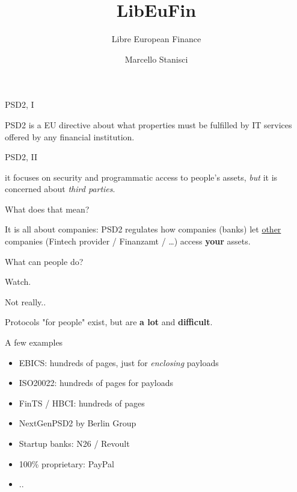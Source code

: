 \documentclass[pdf]{beamer}
\title{LibEuFin}
\subtitle{Libre European Finance}
\author{Marcello Stanisci}
\begin{document}

\begin{frame}
  \titlepage
\end{frame}



\begin{frame}{PSD2, I}
  \begin{center}
  PSD2 is a EU directive about what properties must be fulfilled by
  IT services offered by any financial institution.
  \end{center}
\end{frame}

\begin{frame}{PSD2, II}
  \begin{center}
  it focuses on security and programmatic access to people's assets,
  {\it but} it is concerned about {\it third parties}.
  \end{center}
\end{frame}

\begin{frame}{What does that mean?}
  \begin{center}
  It is all about companies: PSD2 regulates how companies (banks) let
  \underline{other} companies (Fintech provider / Finanzamt / \dots) access
  \textbf{your} assets.
  \end{center}
\end{frame}

\begin{frame}{What can people do?}
  \begin{center}
  Watch.
  \end{center}
\end{frame}

\begin{frame}{Not really..}
  \begin{center}
  Protocols "for people" exist, but are \textbf{a lot}
  and \textbf{difficult}.
  \end{center}
\end{frame}

\begin{frame}{A few examples}
  \begin{itemize}
    \item EBICS: hundreds of pages, just for {\it enclosing} payloads
    \item ISO20022: hundreds of pages for payloads
    \item FinTS / HBCI: hundreds of pages
    \item NextGenPSD2 by Berlin Group 
    \item Startup banks: N26 / Revoult
    \item 100\% proprietary: PayPal
    \item ..
  \end{itemize}
\end{frame}
\end{document}
